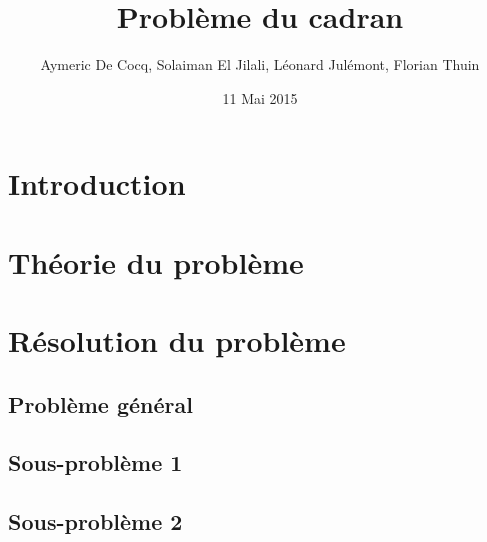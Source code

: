 \documentclass[11pt,a4paper]{article}
\author{Aymeric De Cocq, Solaiman El Jilali, Léonard Julémont, Florian Thuin}
\title{Problème du cadran}
\date{11 Mai 2015}
\begin{document}
\maketitle
\clearpage

\section*{Introduction}


\section{Théorie du problème}

\section{Résolution du problème}
\subsection{Problème général}

\subsection{Sous-problème 1}

\subsection{Sous-problème 2}
\end{document}
